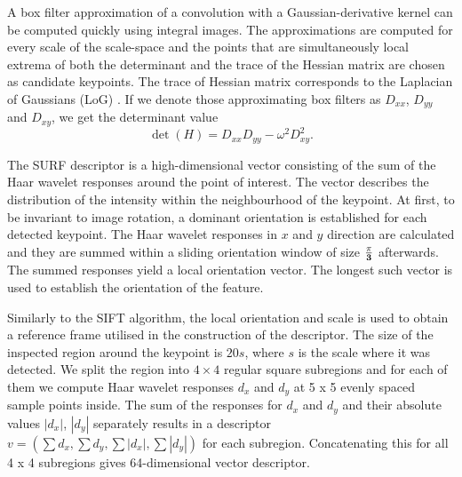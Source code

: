 A box filter approximation of a convolution with a Gaussian-derivative kernel can be computed quickly using integral images. 
The approximations are computed for every scale of the scale-space and 
the points that are simultaneously local extrema of both the determinant and the trace of the Hessian matrix are chosen as candidate keypoints. 
The trace of Hessian matrix corresponds to the Laplacian of Gaussians (LoG) .
If we denote those approximating box filters as $D_{xx}$, $D_{yy}$ and $D_{xy}$, we get the determinant value
\[
\det(H) = D_{xx} D_{yy} - \omega^{2} D_{xy}^{2}.
\]

The SURF descriptor is a high-dimensional vector consisting of the sum of the Haar wavelet responses around the point of interest. %
The vector describes the distribution of the intensity within the neighbourhood of the keypoint. 
At first, to be invariant to image rotation, a dominant orientation is established for each detected keypoint. 
The Haar wavelet responses in $x$ and $y$ direction are calculated 
and they are summed within a sliding orientation window of size $\mathbf{\frac{\pi}{3}}$ afterwards. 
The summed responses yield a local orientation vector. 
The longest such vector is used to establish the orientation of the feature. 

Similarly to the SIFT algorithm, the local orientation and scale is used to obtain a reference frame utilised in the construction of the descriptor. 
The size of the inspected region around the keypoint is $20s$, where $s$ is the scale where it was detected. 
We split the region into $4 \times 4$ regular square subregions and for each of them we compute Haar wavelet responses $d_x$ and $d_y$
at 5 x 5 evenly spaced sample points inside.  
The sum of the responses for $d_x$ and $d_y$ and their absolute values
$|d_x|$, $|d_y|$ separately results in a descriptor 
$v = (\sum{d_x}, \sum{d_y}, \sum{|d_x|}, \sum{|d_y|})$ for each subregion.
Concatenating this for all 4 x 4 subregions gives 64-dimensional vector descriptor.

